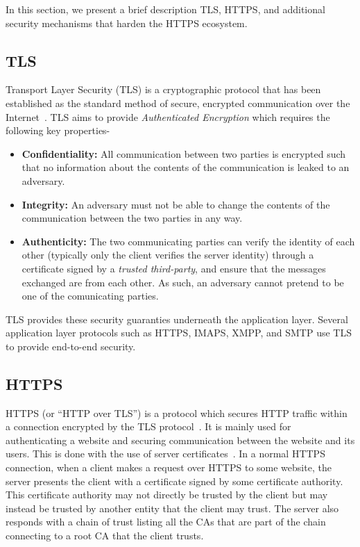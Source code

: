 In this section, we present a brief description TLS, HTTPS, and additional security
mechanisms that harden the HTTPS ecosystem.

\subsection{TLS}
Transport Layer Security (TLS) is a cryptographic protocol that has been
established as the standard method of secure, encrypted communication over the
Internet~\cite{RFC5246}. TLS aims to provide \emph{Authenticated Encryption} which requires the
following key properties-
\begin{itemize}
  \item \textbf{Confidentiality:} All communication between two parties is
    encrypted such that no information about the contents of the communication
    is leaked to an adversary.

  \item \textbf{Integrity:} An adversary must not be able to change the
    contents of the communication between the two parties in any way.

  \item \textbf{Authenticity:} The two communicating parties can verify the
    identity of each other (typically only the client verifies the server
    identity) through a certificate signed by a \emph{trusted third-party}, and
    ensure that the messages exchanged are from each other. As such, an
    adversary cannot pretend to be one of the comunicating parties.
\end{itemize}

TLS provides these security guaranties underneath the application layer.
Several application layer protocols such as HTTPS, IMAPS, XMPP, and SMTP use
TLS to provide end-to-end security.

\subsection{HTTPS}
HTTPS (or ``HTTP over TLS'') is a protocol which secures HTTP traffic within a
connection encrypted by the TLS protocol~\cite{RFC2818}. It is mainly used for
authenticating a website and securing communication between the website and its
users. This is done with the use of server certificates~\cite{RFC5280}.
In a normal HTTPS connection, when a client makes a request over HTTPS to some
website, the server presents the client with a certificate signed by some
certificate authority. This certificate authority may not directly be trusted
by the client but may instead be trusted by another entity that the client may
trust. The server also responds with a chain of trust listing all the CAs that
are part of the chain connecting to a root CA that the client trusts.

